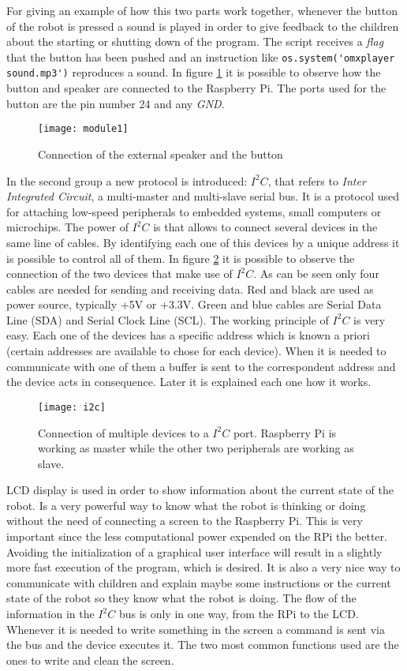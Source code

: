 For giving an example of how this two parts work together, whenever the button of the robot is pressed a sound is played in order to give feedback to the children about the starting or shutting down of the program. The script receives a \textit{flag} that the button has been pushed and an instruction like \lstinline{os.system('omxplayer sound.mp3')} reproduces a sound. In figure \ref{fig:module1} it is possible to observe how the button and speaker are connected to the Raspberry Pi. The ports used for the button are the pin number 24 and any \textit{GND}.

\begin{figure}[h]
\centering
\texttt{[image: module1]}
\caption{Connection of the external speaker and the button}
\label{fig:module1}
\end{figure}

In the second group a new protocol is introduced: $I^{2}C$, that refers to \textit{Inter Integrated Circuit}, a multi-master and multi-slave serial bus. It is a protocol used for attaching low-speed peripherals to embedded systems, small computers or microchips. The power of $I^{2}C$ is that allows to connect several devices in the same line of cables. By identifying each one of this devices by a unique address it is possible to control all of them. In figure \ref{fig:i2c} it is possible to observe the connection of the two devices that make use of $I^{2}C$. As can be seen only four cables are needed for sending and receiving data. Red and black are used as power source, typically +5V or +3.3V. Green and blue cables are Serial Data Line (SDA) and Serial Clock Line (SCL). The working principle of $I^{2}C$ is very easy. Each one of the devices has a specific address which is known a priori (certain addresses are available to chose for each device). When it is needed to communicate with one of them a buffer is sent to the correspondent address and the device acts in consequence. Later it is explained each one how it works.

\begin{figure}[h]
\centering
\texttt{[image: i2c]}
\caption{Connection of multiple devices to a $I^{2}C$ port. Raspberry Pi is working as master while the other two peripherals are working as slave.}
\label{fig:i2c}
\end{figure}


LCD display is used in order to show information about the current state of the robot. Is a very powerful way to know what the robot is thinking or doing without the need of connecting a screen to the Raspberry Pi. This is very important since the less computational power expended on the RPi the better. Avoiding the initialization of a graphical user interface will result in a slightly more fast execution of the program, which is desired. It is also a very nice way to communicate with children and explain maybe some instructions or the current state of the robot so they know what the robot is doing. The flow of the information in the $I^{2}C$ bus is only in one way, from the RPi to the LCD. Whenever it is needed to write something in the screen a command is sent via the bus and the device executes it. The two most common functions used are the ones to write and clean the screen.

